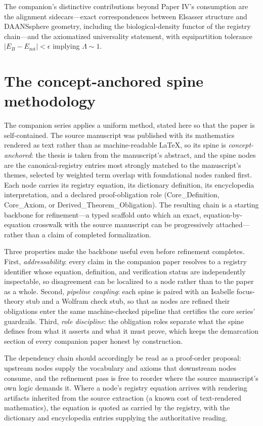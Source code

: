 \documentclass[11pt]{article}
\theoremstyle{remark}
\begin{document}
The companion's distinctive contributions beyond Paper IV's consumption are the alignment sidecars---exact correspondences between Elsasser structure and DAANSsphere geometry, including the biological-density functor of the registry chain---and the axiomatized universality statement, with equipartition tolerance $|E_B - E_{\mathrm{rot}}| < \epsilon$ implying $\Lambda \sim 1$.

\section{The concept-anchored spine methodology}
\label{sec:method}

The companion series applies a uniform method, stated here so that the paper is self-contained. The source manuscript was published with its mathematics rendered as text rather than as machine-readable LaTeX, so its spine is \emph{concept-anchored}: the thesis is taken from the manuscript's abstract, and the spine nodes are the canonical-registry entries most strongly matched to the manuscript's themes, selected by weighted term overlap with foundational nodes ranked first. Each node carries its registry equation, its dictionary definition, its encyclopedia interpretation, and a declared proof-obligation role (Core\_Definition, Core\_Axiom, or Derived\_Theorem\_Obligation). The resulting chain is a starting backbone for refinement---a typed scaffold onto which an exact, equation-by-equation crosswalk with the source manuscript can be progressively attached---rather than a claim of completed formalization.

Three properties make the backbone useful even before refinement completes. First, \emph{addressability}: every claim in the companion paper resolves to a registry identifier whose equation, definition, and verification status are independently inspectable, so disagreement can be localized to a node rather than to the paper as a whole. Second, \emph{pipeline coupling}: each spine is paired with an Isabelle focus-theory stub and a Wolfram check stub, so that as nodes are refined their obligations enter the same machine-checked pipeline that certifies the core series' guardrails. Third, \emph{role discipline}: the obligation roles separate what the spine defines from what it asserts and what it must prove, which keeps the demarcation section of every companion paper honest by construction.

The dependency chain should accordingly be read as a proof-order proposal: upstream nodes supply the vocabulary and axioms that downstream nodes consume, and the refinement pass is free to reorder where the source manuscript's own logic demands it. Where a node's registry equation arrives with rendering artifacts inherited from the source extraction (a known cost of text-rendered mathematics), the equation is quoted as carried by the registry, with the dictionary and encyclopedia entries supplying the authoritative reading.
\end{document}
